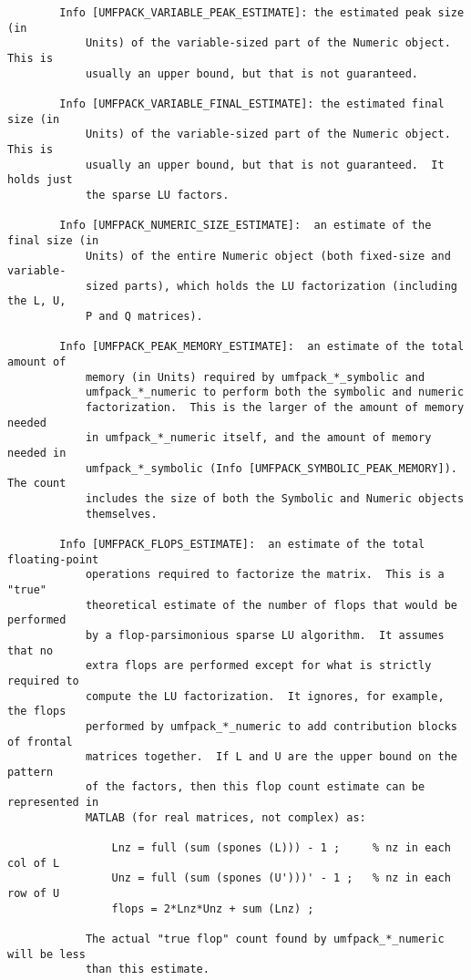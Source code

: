 {\begin{verbatim}
        Info [UMFPACK_VARIABLE_PEAK_ESTIMATE]: the estimated peak size (in
            Units) of the variable-sized part of the Numeric object.  This is
            usually an upper bound, but that is not guaranteed.

        Info [UMFPACK_VARIABLE_FINAL_ESTIMATE]: the estimated final size (in
            Units) of the variable-sized part of the Numeric object.  This is
            usually an upper bound, but that is not guaranteed.  It holds just
            the sparse LU factors.

        Info [UMFPACK_NUMERIC_SIZE_ESTIMATE]:  an estimate of the final size (in
            Units) of the entire Numeric object (both fixed-size and variable-
            sized parts), which holds the LU factorization (including the L, U,
            P and Q matrices).

        Info [UMFPACK_PEAK_MEMORY_ESTIMATE]:  an estimate of the total amount of
            memory (in Units) required by umfpack_*_symbolic and
            umfpack_*_numeric to perform both the symbolic and numeric
            factorization.  This is the larger of the amount of memory needed
            in umfpack_*_numeric itself, and the amount of memory needed in
            umfpack_*_symbolic (Info [UMFPACK_SYMBOLIC_PEAK_MEMORY]).  The count
            includes the size of both the Symbolic and Numeric objects
            themselves.

        Info [UMFPACK_FLOPS_ESTIMATE]:  an estimate of the total floating-point
            operations required to factorize the matrix.  This is a "true"
            theoretical estimate of the number of flops that would be performed
            by a flop-parsimonious sparse LU algorithm.  It assumes that no
            extra flops are performed except for what is strictly required to
            compute the LU factorization.  It ignores, for example, the flops
            performed by umfpack_*_numeric to add contribution blocks of frontal
            matrices together.  If L and U are the upper bound on the pattern
            of the factors, then this flop count estimate can be represented in
            MATLAB (for real matrices, not complex) as:

                Lnz = full (sum (spones (L))) - 1 ;     % nz in each col of L
                Unz = full (sum (spones (U')))' - 1 ;   % nz in each row of U
                flops = 2*Lnz*Unz + sum (Lnz) ;

            The actual "true flop" count found by umfpack_*_numeric will be less
            than this estimate.


\end{verbatim}}
